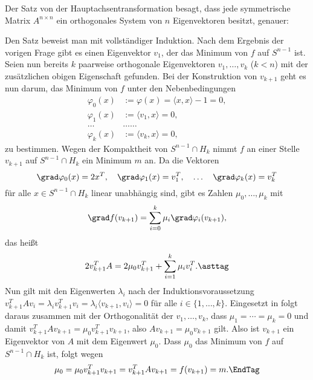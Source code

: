 \begin{antwort} 
  
  Der Satz von der Hauptachsentransformation besagt, dass jede symmetrische 
  Matrix $A^{n\times n}$ ein orthogonales System von $n$ 
  Eigenvektoren besitzt, genauer:  

  \medskip\noindent

  \medskip\noindent
  Den Satz beweist man mit vollständiger Induktion. Nach 
  dem Ergebnis der vorigen Frage gibt es einen Eigenvektor $v_1$, 
  der das Minimum von $f$ auf $S^{n-1}$ ist. Seien nun bereits 
  $k$ paarweise orthogonale Eigenvektoren $v_1,\ldots, v_k$ ($k<n$) 
  mit der zusätzlichen obigen Eigenschaft gefunden. Bei der Konstruktion 
  von $v_{k+1}$ geht es nun darum, das Minimum von $f$ unter den 
  Nebenbedingungen
  \begin{align*}
    \varphi_0(x) &:= \varphi(x) = \langle x, x \rangle -1 =0,\\
    \varphi_1(x) &:= \langle v_1, x\rangle = 0, \\
    \ldots &\ldots \ldots \\
    \varphi_k(x) &:=\langle v_k, x \rangle = 0,
  \end{align*}
  zu bestimmen. 
  Wegen der Kompaktheit von $S^{n-1}\cap H_k$ nimmt $f$ an einer 
  Stelle $v_{k+1}$ auf $S^{n-1}\cap H_k$ ein Minimum $m$ an. 
  Da die Vektoren  
  \[
  \grad \varphi_0 (x) = 2x^T, \quad
  \grad \varphi_1 (x) = v_1^T, \quad \ldots \quad 
  \grad \varphi_k (x) = v_k^T
  \]
  für alle $x\in S^{n-1} \cap H_k$ linear unabhängig sind, gibt es 
  Zahlen $\mu_0,\ldots,\mu_k$ mit 
  \[
  \grad f(v_{k+1}) = \sum_{i=0}^k \mu_i \grad\varphi_i(v_{k+1}),
  \]
  das heißt
  \begin{equation}
    2v_{k+1}^T A  = 2\mu_0 v^T_{k+1} + 
    \sum_{i=1}^k \mu_i v_i^T. 
    \asttag
  \end{equation}
  Nun gilt mit den Eigenwerten $\lambda_i$
  nach der Induktionsvoraussetzung  
  $v_{k+1}^T A v_i = 
  \lambda_i v_{k+1}^T v_i = 
  \lambda_i \langle v_{k+1}, v_i \rangle =0
  $ für alle $i \in \{ 1,\ldots, k \}$. Eingesetzt in {\astref} folgt 
  daraus zusammen mit der Orthogonalität der $v_1,\ldots, v_k$, dass 
  $\mu_1 = \cdots = \mu_k =0$ und damit 
  $v_{k+1}^T A v_{k+1} = \mu_0 v_{k+1}^T v_{k+1}$, also 
  $Av_{k+1}=\mu_0 v_{k+1}$ gilt. 
  Also ist $v_{k+1}$ ein Eigenvektor von $A$ mit dem Eigenwert $\mu_0$. 
  Dass $\mu_0$ das Minimum von $f$ auf $S^{n-1} \cap H_k$ ist, folgt 
  wegen 
  \begin{equation}
    \mu_0 = \mu_0 v_{k+1}^T v_{k+1} = v_{k+1}^T A v_{k+1} = f(v_{k+1})=m.
    \EndTag
  \end{equation}
\end{antwort}


















